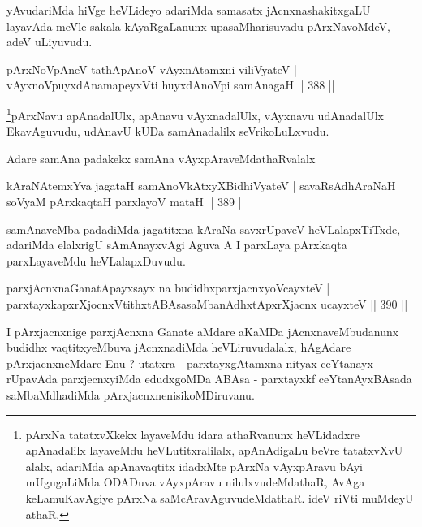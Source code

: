 \begin{artha}
yAvudariMda hiVge heVLideyo adariMda samasatx jAcnxnashakitxgaLU layavAda meVle sakala kAyaRgaLanunx upasaMharisuvadu pArxNavoMdeV, adeV \-uLiyuvudu.
\end{artha}


\begin{shl}
pArxNoV\s pAneV tathA\s pAnoV vAyxnAtamxni viliVyateV |
vAyxnoV\s puyxdAnamapeyxVti huyxdAnoV\s pi samAnagaH \hfill || 388 ||
\end{shl}

\begin{artha}
\footnote[1]{pArxNa tatatxvXkekx layaveMdu idara athaRvanunx heVLidadxre apAnadalilx layaveMdu heVLutitxralilalx, apAnAdigaLu beVre tatatxvXvU alalx, adariMda apAnavaqtitx idadxMte pArxNa vAyxpAravu bAyi mUgugaLiMda ODADuva vAyxpAravu nilulxvudeMdathaR, AvAga keLamuKavAgiye pArxNa saMcAravAguvudeMdathaR. ideV riVti muMdeyU athaR.}pArxNavu apAnadalUlx, apAnavu vAyxnadalUlx, vAyxnavu udAnadalUlx EkavAguvudu, udAnavU kUDa samAnadalilx seVrikoLuLxvudu.
\end{artha}

\begin{artha}
Adare samAna padakekx samAna vAyxpAraveMdathaRvalalx
\end{artha}

\begin{shl}
kAraNAtemxYva jagataH samAnoVkAtxyX\s BidhiVyateV |
savaRsAdhAraNaH soV\s yaM pArxkaqtaH parxlayoV mataH \hfill || 389 ||
\end{shl}

\begin{artha}
samAnaveMba padadiMda jagatitxna kAraNa savxrUpaveV heVLalapxTiTxde, adariMda elalxrigU sAmAnayxvAgi Aguva A I parxLaya pArxkaqta parxLayaveMdu heVLalapxDuvudu.
\end{artha}


\begin{shl}
parxjAcnxnaGanatA\s payxsayx na budidhxparxjacnxyoVcayxteV |
parxtayxkapxrXjocnxVtithxtABAsasaMbanAdhxtApxrXjacnx ucayxteV \hfill || 390 ||
\end{shl}

\begin{artha}
I pArxjacnxnige parxjAcnxna Ganate aMdare aKaMDa jAcnxnaveMbudanunx budidhx vaqtitxyeMbuva jAcnxnadiMda heVLiruvudalalx, hAgAdare pArxjacnxneMdare Enu ? utatxra - parxtayxgAtamxna nityax ceYtanayx rUpavAda parxjecnxyiMda edudxgoMDa ABAsa - parxtayxkf ceYtanAyxBAsada saMbaMdhadiMda pArxjacnxnenisikoMDiruvanu.
\end{artha}

